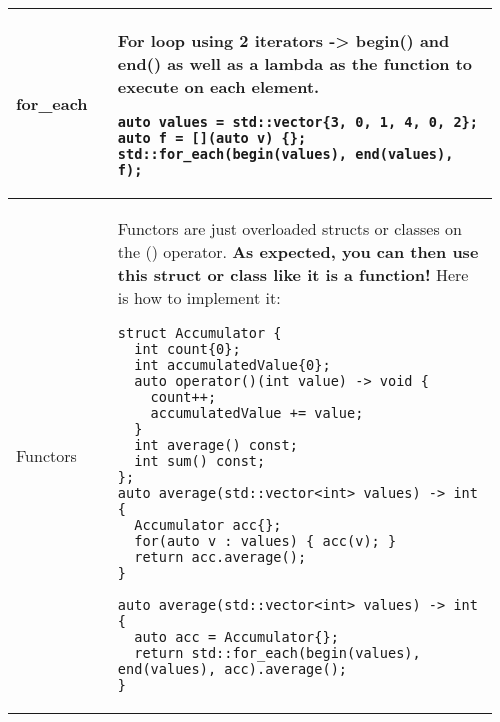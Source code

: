 \documentclass[main.tex,fontsize=8pt,paper=a4,paper=portrait,DIV=calc,]{scrartcl}
\begin{document}
\begin{table}[ht!]
\begin{tabular}{|m{0.2\linewidth}|m{0.755\linewidth}|}
\\
\hline
for\_each & 
For loop using 2 iterators -> \textbf{begin()} and \textbf{end()} as well as a \textbf{lambda} as the function to execute on each element.\newline
\begin{lstlisting}
auto values = std::vector{3, 0, 1, 4, 0, 2};
auto f = [](auto v) {};
std::for_each(begin(values), end(values), f);
\end{lstlisting}\\
\hline
Functors & 
Functors are just overloaded structs or classes on the () operator.\newline
\textbf{As expected, you can then use this struct or class like it is a function!}\newline
Here is how to implement it:\newline 
\begin{lstlisting}
struct Accumulator {
  int count{0};
  int accumulatedValue{0};
  auto operator()(int value) -> void {
    count++;
    accumulatedValue += value;
  }
  int average() const;
  int sum() const;
};
auto average(std::vector<int> values) -> int {
  Accumulator acc{};
  for(auto v : values) { acc(v); }
  return acc.average();
}

auto average(std::vector<int> values) -> int {
  auto acc = Accumulator{};
  return std::for_each(begin(values), end(values), acc).average();
}
\end{lstlisting}\\
\hline
\end{tabular}
\end{table}
\pagebreak
\end{document}

